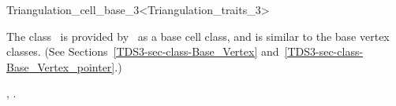 

\begin{ccRefClass}{Triangulation_cell_base_3<Triangulation_traits_3>}  %


\ccDefinition
  
The class \ccRefName\ is provided by \cgal\ as a base cell class, 
and is similar
to the base vertex classes. (See
Sections~\ref{TDS3-sec-class-Base_Vertex}
and~\ref{TDS3-sec-class-Base_Vertex_pointer}.) 


\ccIsModel


\ccSeeAlso

,
.



\end{ccRefClass}


